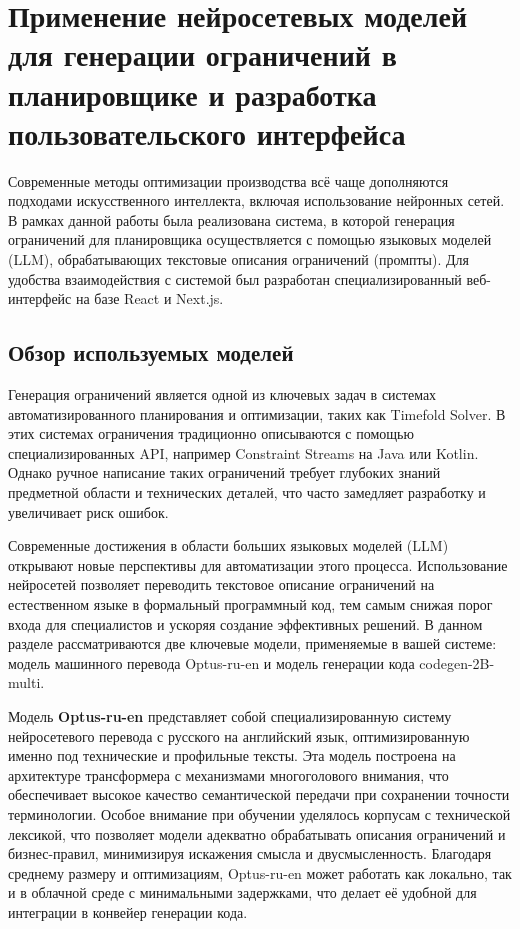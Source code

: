 \chapter{Применение нейросетевых моделей для генерации ограничений в планировщике и разработка пользовательского интерфейса}
\label{ch:chapter4}

Современные методы оптимизации производства всё чаще дополняются подходами искусственного интеллекта, включая использование нейронных сетей. В рамках данной работы была реализована система, в которой генерация ограничений для планировщика осуществляется с помощью языковых моделей (LLM), обрабатывающих текстовые описания ограничений (промпты). Для удобства взаимодействия с системой был разработан специализированный веб-интерфейс на базе React и Next.js.

\section{Обзор используемых моделей }

Генерация ограничений является одной из ключевых задач в системах автоматизированного планирования и оптимизации, таких как Timefold Solver. В этих системах ограничения традиционно описываются с помощью специализированных API, например Constraint Streams на Java или Kotlin. Однако ручное написание таких ограничений требует глубоких знаний предметной области и технических деталей, что часто замедляет разработку и увеличивает риск ошибок.

Современные достижения в области больших языковых моделей (LLM) открывают новые перспективы для автоматизации этого процесса. Использование нейросетей позволяет переводить текстовое описание ограничений на естественном языке в формальный программный код, тем самым снижая порог входа для специалистов и ускоряя создание эффективных решений. В данном разделе рассматриваются две ключевые модели, применяемые в вашей системе: модель машинного перевода Optus-ru-en и модель генерации кода codegen-2B-multi.

Модель \textbf{Optus-ru-en} представляет собой специализированную систему нейросетевого перевода с русского на английский язык, оптимизированную именно под технические и профильные тексты. Эта модель построена на архитектуре трансформера с механизмами многоголового внимания, что обеспечивает высокое качество семантической передачи при сохранении точности терминологии. Особое внимание при обучении уделялось корпусам с технической лексикой, что позволяет модели адекватно обрабатывать описания ограничений и бизнес-правил, минимизируя искажения смысла и двусмысленность. Благодаря среднему размеру и оптимизациям, Optus-ru-en может работать как локально, так и в облачной среде с минимальными задержками, что делает её удобной для интеграции в конвейер генерации кода.

